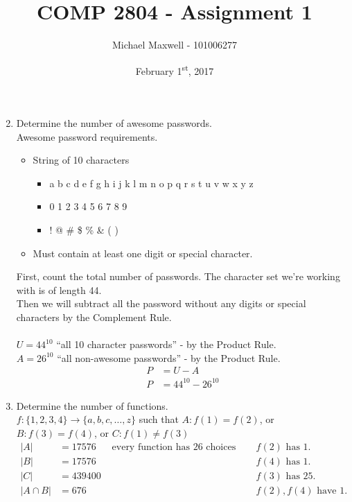\documentclass{article}
\title{COMP 2804 - Assignment 1}
\author{Michael Maxwell - 101006277}
\date{February 1\textsuperscript{st}, 2017}
\begin{document}
	\maketitle

	\begin{enumerate}
		\setcounter{enumi}{1}
		\item
			Determine the number of awesome passwords. \\
			Awesome password requirements.
			\begin{itemize}
				\item String of 10 characters
				\begin{itemize}
					\item a b c d e f g h i j k l m n o p q r s t u v w x y z
					\item 0 1 2 3 4 5 6 7 8 9
					\item ! @ \# \$ \% \& ( )
				\end{itemize}
				\item Must contain at least one digit or special character.
			\end{itemize}
			First, count the total number of passwords. The character set we're working with is of length 44. \\
			Then we will subtract all the password without any digits or special characters by the Complement Rule. \\
			\\
			$U = 44^{10}$ ``all 10 character passwords'' - by the Product Rule. \\
			$A = 26^{10}$ ``all non-awesome passwords'' - by the Product Rule.
			\begin{align*}
				P &= U - A \\
				P &= 44^{10} - 26^{10}
			\end{align*}
		\item
			Determine the number of functions. \\
			$f: \{1, 2, 3, 4\} \rightarrow \{a, b, c, \ldots, z\}$ such that $A: f(1) = f(2)$, or $B: f(3) = f(4)$, or $C: f(1) \neq f(3)$
			\begin{align*}
				\left|A\right| &= 17576&\text{ every function has 26 choices except }&f(2)\text{ has 1.} \\
				\left|B\right| &= 17576&&f(4)\text{ has 1.} \\
				\left|C\right| &= 439400&&f(3)\text{ has 25.} \\
				\left|A \cap B\right| &= 676&&f(2), f(4)\text{ have 1.} \\

\end{align*}
\end{enumerate}
\end{document}
